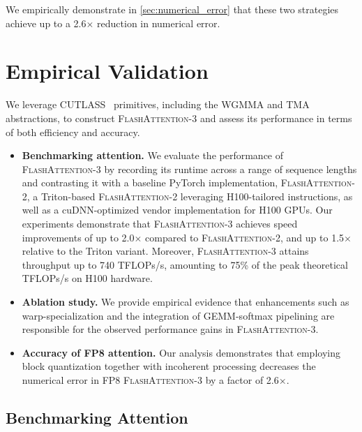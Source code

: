 \begin{enumerate}
We empirically demonstrate in \cref{sec:numerical_error} that these two strategies achieve up to a 2.6$\times$ reduction in numerical error.

\section{Empirical Validation}
\label{sec:exp}

We leverage CUTLASS~\citep{Thakkar_CUTLASS_2023} primitives, including the WGMMA and TMA abstractions, to construct \textsc{FlashAttention-3} and assess its performance in terms of both efficiency and accuracy.

\begin{itemize}

\item \textbf{Benchmarking attention.} We evaluate the performance of \textsc{FlashAttention-3} by recording its runtime across a range of sequence lengths and contrasting it with a baseline PyTorch implementation, \textsc{FlashAttention-2}, a Triton-based \textsc{FlashAttention-2} leveraging H100-tailored instructions, as well as a cuDNN-optimized vendor implementation for H100 GPUs. Our experiments demonstrate that \textsc{FlashAttention-3} achieves speed improvements of up to 2.0$\times$ compared to \textsc{FlashAttention-2}, and up to 1.5$\times$ relative to the Triton variant. Moreover, \textsc{FlashAttention-3} attains throughput up to 740 TFLOPs/s, amounting to 75\% of the peak theoretical TFLOPs/s on H100 hardware.

\item \textbf{Ablation study.} We provide empirical evidence that enhancements such as warp-specialization and the integration of GEMM-softmax pipelining are responsible for the observed performance gains in \textsc{FlashAttention-3}.

\item \textbf{Accuracy of FP8 attention.} Our analysis demonstrates that employing block quantization together with incoherent processing decreases the numerical error in FP8 \textsc{FlashAttention-3} by a factor of 2.6$\times$.
\end{itemize}

\subsection{Benchmarking Attention}
\label{subsec:benchmark_attn}


\end{enumerate}
